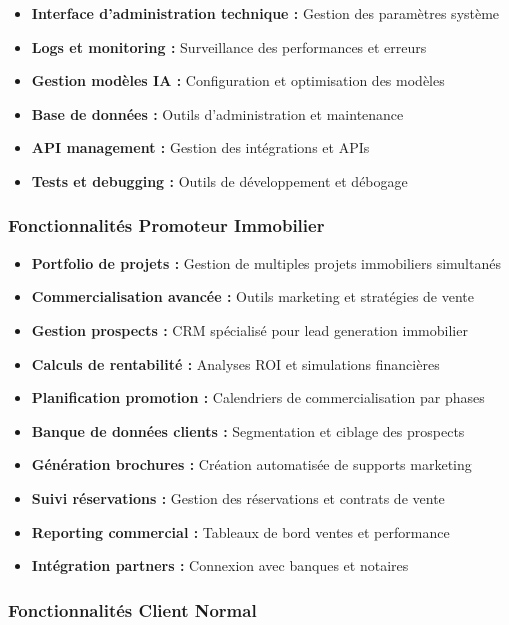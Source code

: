\begin{itemize}
    \item \textbf{Interface d'administration technique :} Gestion des paramètres système
    \item \textbf{Logs et monitoring :} Surveillance des performances et erreurs
    \item \textbf{Gestion modèles IA :} Configuration et optimisation des modèles
    \item \textbf{Base de données :} Outils d'administration et maintenance
    \item \textbf{API management :} Gestion des intégrations et APIs
    \item \textbf{Tests et debugging :} Outils de développement et débogage
\end{itemize}

\subsubsection{Fonctionnalités Promoteur Immobilier}

\begin{itemize}
    \item \textbf{Portfolio de projets :} Gestion de multiples projets immobiliers simultanés
    \item \textbf{Commercialisation avancée :} Outils marketing et stratégies de vente
    \item \textbf{Gestion prospects :} CRM spécialisé pour lead generation immobilier
    \item \textbf{Calculs de rentabilité :} Analyses ROI et simulations financières
    \item \textbf{Planification promotion :} Calendriers de commercialisation par phases
    \item \textbf{Banque de données clients :} Segmentation et ciblage des prospects
    \item \textbf{Génération brochures :} Création automatisée de supports marketing
    \item \textbf{Suivi réservations :} Gestion des réservations et contrats de vente
    \item \textbf{Reporting commercial :} Tableaux de bord ventes et performance
    \item \textbf{Intégration partners :} Connexion avec banques et notaires
\end{itemize}

\subsubsection{Fonctionnalités Client Normal}

